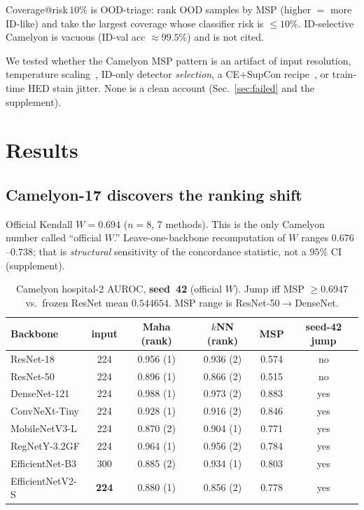 \documentclass[10pt,twocolumn,letterpaper]{article}
\begin{document}
Coverage@risk\,$10\%$ is OOD-triage: rank OOD samples by MSP (higher ${=}$ more ID-like) and take the largest coverage whose classifier risk is ${\le}10\%$.
ID-selective Camelyon is vacuous (ID-val acc ${\approx}99.5\%$) and is not cited.

We tested whether the Camelyon MSP pattern is an artifact of input resolution, temperature scaling~\cite{guo2017calibration}, ID-only detector \emph{selection}, a CE{+}SupCon recipe~\cite{khosla2020supcon}, or train-time HED stain jitter.
None is a clean account (Sec.~\ref{sec:failed} and the supplement).

\section{Results}

\subsection{Camelyon-17 discovers the ranking shift}
\label{sec:camelyon}

Official Kendall $W=\mathbf{0.694}$ ($n{=}8$, 7 methods).
This is the only Camelyon number called ``official $W$.''
Leave-one-backbone recomputation of $W$ ranges $0.676$--$0.738$; that is \emph{structural} sensitivity of the concordance statistic, not a $95\%$ CI (supplement).

\begin{table}[t]
\centering
\small
\setlength{\tabcolsep}{6pt}
\begin{tabular}{@{}lccccc@{}}
\toprule
Backbone & input & Maha (rank) & $k$NN (rank) & MSP & seed-42 jump \\
\midrule
ResNet-18 & 224 & 0.956 (1) & 0.936 (2) & 0.574 & no \\
ResNet-50 & 224 & 0.896 (1) & 0.866 (2) & 0.515 & no \\
DenseNet-121 & 224 & 0.988 (1) & 0.973 (2) & 0.883 & yes \\
ConvNeXt-Tiny & 224 & 0.928 (1) & 0.916 (2) & 0.846 & yes \\
MobileNetV3-L & 224 & 0.870 (2) & 0.904 (1) & 0.771 & yes \\
RegNetY-3.2GF & 224 & 0.964 (1) & 0.956 (2) & 0.784 & yes \\
EfficientNet-B3 & 300 & 0.885 (2) & 0.934 (1) & 0.803 & yes \\
EfficientNetV2-S & \textbf{224} & 0.880 (1) & 0.856 (2) & 0.778 & yes \\
\bottomrule
\end{tabular}
\caption{Camelyon hospital-2 AUROC, \textbf{seed~42} (official $W$).
Jump iff MSP ${\ge}0.6947$ vs.\ frozen ResNet mean $0.544654$.
MSP range is ResNet-50${\to}$DenseNet.}
\label{tab:cam}
\end{table}
\end{document}
